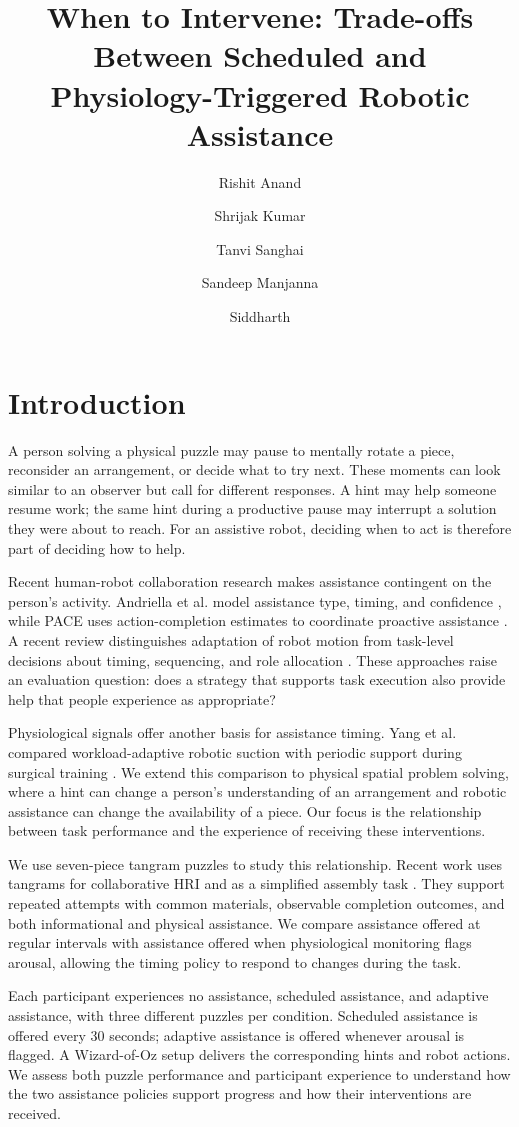 \documentclass[sigconf]{aamas}
\title{When to Intervene: Trade-offs Between Scheduled and Physiology-Triggered Robotic Assistance}
\author@bx@sep=0.2pc\relax
\author{Rishit Anand}
\affiliation{\institution{}\city{}\country{}}
\author{Shrijak Kumar}
\affiliation{\institution{}\city{}\country{}}
\author{Tanvi Sanghai}
\affiliation{\institution{}\city{}\country{}}
\author{Sandeep Manjanna}
\affiliation{\institution{}\city{}\country{}}
\author{Siddharth}
\affiliation{\institution{}\city{}\country{}}
\begin{document}
\maketitle

\section{Introduction}

A person solving a physical puzzle may pause to mentally rotate a piece, reconsider an arrangement, or decide what to try next. These moments can look similar to an observer but call for different responses. A hint may help someone resume work; the same hint during a productive pause may interrupt a solution they were about to reach. For an assistive robot, deciding when to act is therefore part of deciding how to help.

Recent human-robot collaboration research makes assistance contingent on the person's activity. Andriella et al. model assistance type, timing, and confidence \cite{andriella2025}, while PACE uses action-completion estimates to coordinate proactive assistance \cite{delazzari2025}. A recent review distinguishes adaptation of robot motion from task-level decisions about timing, sequencing, and role allocation \cite{karbouj2026}. These approaches raise an evaluation question: does a strategy that supports task execution also provide help that people experience as appropriate?

Physiological signals offer another basis for assistance timing. Yang et al. compared workload-adaptive robotic suction with periodic support during surgical training \cite{yang2024}. We extend this comparison to physical spatial problem solving, where a hint can change a person's understanding of an arrangement and robotic assistance can change the availability of a piece. Our focus is the relationship between task performance and the experience of receiving these interventions.

We use seven-piece tangram puzzles to study this relationship. Recent work uses tangrams for collaborative HRI and as a simplified assembly task \cite{tabatabaei2025,melo2026}. They support repeated attempts with common materials, observable completion outcomes, and both informational and physical assistance. We compare assistance offered at regular intervals with assistance offered when physiological monitoring flags arousal, allowing the timing policy to respond to changes during the task.

Each participant experiences no assistance, scheduled assistance, and adaptive assistance, with three different puzzles per condition. Scheduled assistance is offered every 30 seconds; adaptive assistance is offered whenever arousal is flagged. A Wizard-of-Oz setup delivers the corresponding hints and robot actions. We assess both puzzle performance and participant experience to understand how the two assistance policies support progress and how their interventions are received.
\end{document}
